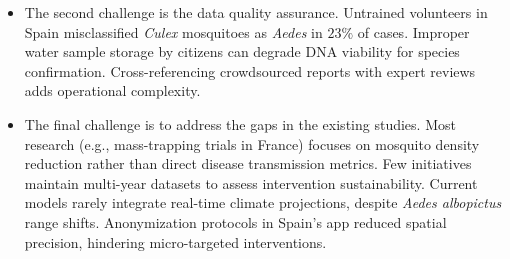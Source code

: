 \documentclass[acmlarge]{acmart}
\begin{document}
\begin{itemize}
\item The second challenge is the data quality assurance.
Untrained volunteers in Spain misclassified \textit{Culex} mosquitoes as \textit{Aedes} in \(23\%\) of cases. Improper water sample storage by citizens can degrade DNA viability for species confirmation. Cross-referencing crowdsourced reports with expert reviews adds operational complexity.\end{itemize}


\begin{itemize}
\item The final challenge is to address the gaps in the existing studies.
Most research (e.g., mass-trapping trials in France) focuses on mosquito density reduction rather than direct disease transmission metrics. Few initiatives maintain multi-year datasets to assess intervention sustainability. Current models rarely integrate real-time climate projections, despite \textit{Aedes albopictus} range shifts.
Anonymization protocols in Spain’s app reduced spatial precision, hindering micro-targeted interventions.\end{itemize}
\end{document}
